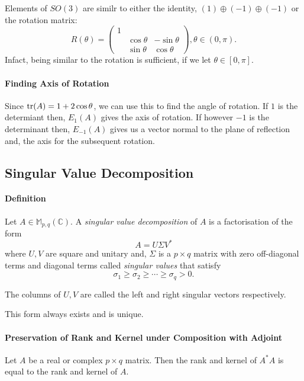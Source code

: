 Elements of \( SO(3) \) are similr to either the identity, \( (1) \oplus (-1) \oplus (-1) \)
or the rotation matrix: \[
    R(\theta) = \begin{pmatrix}
        1   &               &               \\
            & \cos \theta   & - \sin \theta \\
            & \sin \theta   & \cos \theta
    \end{pmatrix}, \theta \in (0, \pi)
.\]
Infact, being similar to the rotation is sufficient, if we let
\( \theta \in [0, \pi] \).

\paragraph{Finding Axis of Rotation}
Since \( \tr(A) = 1 + 2\cos \theta \), we can use this to find the angle
of rotation.
If \( 1 \) is the determiant then, \( E_1 (A) \) gives the axis of rotation.
If however \( -1 \) is the determinant then, \( E_{-1}(A) \) gives
us a vector normal to the plane of reflection and, the axis for the
subsequent rotation.

%
%
%
\subsection{Singular Value Decomposition}

\paragraph{Definition}
Let \( A \in \mathbb{M}_{p, q} (\mathbb{C}) \).
A \textit{singular value decomposition} of \( A \) is a factorisation
of the form \[
    A = U \Sigma V^*
\] where \( U, V \) are square and unitary and, \( \Sigma \)
is a \( p\times q \) matrix with zero off-diagonal terms and diagonal
terms called \textit{singular values} that satisfy \[
    \sigma_1 \geq \sigma_2 \geq \cdots \geq \sigma_q > 0
.\]

The columns of \( U, V \) are called the left and right singular vectors
respectively.

This form always exists and is unique.

\paragraph{Preservation of Rank and Kernel under Composition with Adjoint}
Let \( A \) be a real or complex \( p\times q \) matrix.
Then the rank and kernel of \( A^* A \) is equal to the rank and kernel
of \( A \).

